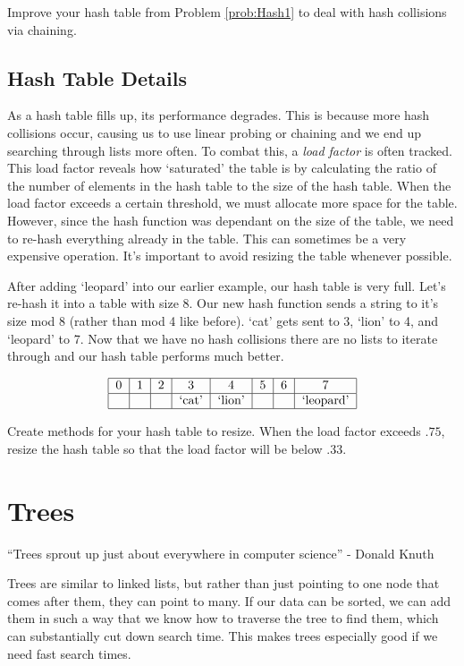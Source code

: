 \begin{problem}
Improve your hash table from Problem \ref{prob:Hash1} to deal with hash collisions via chaining.
\end{problem}

\subsection*{Hash Table Details}
As a hash table fills up, its performance degrades.
This is because more hash collisions occur, causing us to use linear probing or chaining and we end up searching through lists more often.
To combat this, a \emph{load factor} is often tracked.
This load factor reveals how `saturated' the table is by calculating the ratio of the number of elements in the hash table to the size of the hash table.
When the load factor exceeds a certain threshold, we must allocate more space for the table.
However, since the hash function was dependant on the size of the table, we need to re-hash everything already in the table.
This can sometimes be a very expensive operation.
It's important to avoid resizing the table whenever possible.

After adding `leopard' into our earlier example, our hash table is very full. Let's re-hash it into a table with size 8.
Our new hash function sends a string to it's size mod 8 (rather than mod 4 like before).
`cat' gets sent to 3, `lion' to 4, and `leopard' to 7.
Now that we have no hash collisions there are no lists to iterate through and our hash table performs much better.

\[
\begin{tabular}{|c|c|c|c|c|c|c|c|}
\hline
0 & 1 & 2 & 3 & 4 & 5 & 6 & 7 \\
\hline
 & & & `cat' & `lion' & & &`leopard' \\
\hline
\end{tabular}
\]

\begin{problem}
Create methods for your hash table to resize.
When the load factor exceeds $.75$, resize the hash table so that the load factor will be below $.33$.
\label{prob:Hash3}
\end{problem}

\section*{Trees}
``Trees sprout up just about everywhere in computer science'' - Donald Knuth

Trees are similar to linked lists, but rather than just pointing to one node that comes after them, they can point to many.
If our data can be sorted, we can add them in such a way that we know how to traverse the tree to find them, which can substantially cut down search time.
This makes trees especially good if we need fast search times.


